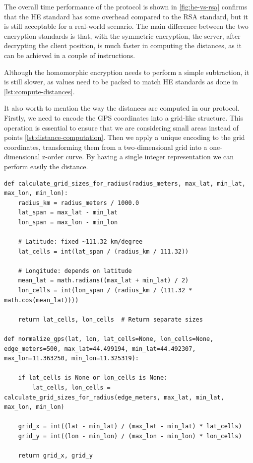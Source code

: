 The overall time performance of the protocol is shown in \cref{fig:he-vs-rsa} confirms that the HE standard has some overhead compared to the RSA standard, but it is still acceptable for a real-world scenario. The main difference between the two encryption standards is that, with the symmetric encryption, the server, after decrypting the client position, is much faster in computing the distances, as it can be achieved in a couple of instructions.

Although the homomorphic encryption needs to perform a simple subtraction, it is still slower, as values need to be packed to match HE standards as done in \cref{lst:compute-distances}.

It also worth to mention the way the distances are computed in our protocol. Firstly, we need to encode the GPS coordinates into a grid-like structure. This operation is essential to ensure that we are considering small areas instead of points \cref{lst:distance-computation}. Then we apply a unique encoding to the grid coordinates, transforming them from a two-dimensional grid into a one-dimensional z-order curve. By having a single integer representation we can perform easily the distance.

\begin{lstlisting}[caption={Distance computation using z-order encoding}, label={lst:distance-computation}]
def calculate_grid_sizes_for_radius(radius_meters, max_lat, min_lat, max_lon, min_lon):
    radius_km = radius_meters / 1000.0
    lat_span = max_lat - min_lat
    lon_span = max_lon - min_lon
    
    # Latitude: fixed ~111.32 km/degree
    lat_cells = int(lat_span / (radius_km / 111.32))
    
    # Longitude: depends on latitude
    mean_lat = math.radians((max_lat + min_lat) / 2)
    lon_cells = int(lon_span / (radius_km / (111.32 * math.cos(mean_lat))))
    
    return lat_cells, lon_cells  # Return separate sizes

def normalize_gps(lat, lon, lat_cells=None, lon_cells=None, edge_meters=500, max_lat=44.499194, min_lat=44.492307, max_lon=11.363250, min_lon=11.325319):

    if lat_cells is None or lon_cells is None:
        lat_cells, lon_cells = calculate_grid_sizes_for_radius(edge_meters, max_lat, min_lat, max_lon, min_lon)
    
    grid_x = int((lat - min_lat) / (max_lat - min_lat) * lat_cells)
    grid_y = int((lon - min_lon) / (max_lon - min_lon) * lon_cells)
    
    return grid_x, grid_y
\end{lstlisting}

